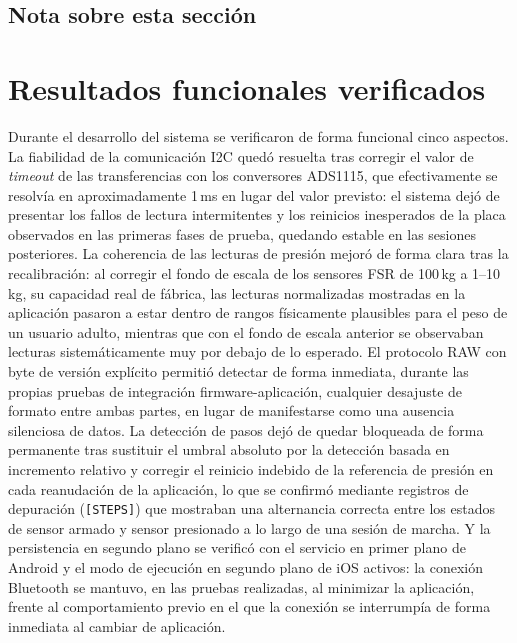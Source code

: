 \begin{IAtext}

\subsection*{Nota sobre esta sección}

\section{Resultados funcionales verificados}

Durante el desarrollo del sistema se verificaron de forma funcional cinco aspectos. La fiabilidad de la comunicación I2C quedó resuelta tras corregir el valor de \textit{timeout} de las transferencias con los conversores ADS1115, que efectivamente se resolvía en aproximadamente 1\,ms en lugar del valor previsto: el sistema dejó de presentar los fallos de lectura intermitentes y los reinicios inesperados de la placa observados en las primeras fases de prueba, quedando estable en las sesiones posteriores. La coherencia de las lecturas de presión mejoró de forma clara tras la recalibración: al corregir el fondo de escala de los sensores FSR de 100\,kg a 1--10\,kg, su capacidad real de fábrica, las lecturas normalizadas mostradas en la aplicación pasaron a estar dentro de rangos físicamente plausibles para el peso de un usuario adulto, mientras que con el fondo de escala anterior se observaban lecturas sistemáticamente muy por debajo de lo esperado. El protocolo RAW con byte de versión explícito permitió detectar de forma inmediata, durante las propias pruebas de integración firmware-aplicación, cualquier desajuste de formato entre ambas partes, en lugar de manifestarse como una ausencia silenciosa de datos. La detección de pasos dejó de quedar bloqueada de forma permanente tras sustituir el umbral absoluto por la detección basada en incremento relativo y corregir el reinicio indebido de la referencia de presión en cada reanudación de la aplicación, lo que se confirmó mediante registros de depuración (\texttt{[STEPS]}) que mostraban una alternancia correcta entre los estados de sensor armado y sensor presionado a lo largo de una sesión de marcha. Y la persistencia en segundo plano se verificó con el servicio en primer plano de Android y el modo de ejecución en segundo plano de iOS activos: la conexión Bluetooth se mantuvo, en las pruebas realizadas, al minimizar la aplicación, frente al comportamiento previo en el que la conexión se interrumpía de forma inmediata al cambiar de aplicación.


\end{IAtext}
